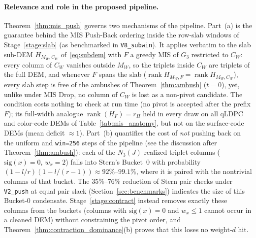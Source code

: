 \documentclass[12pt]{article}
\theoremstyle{definition}
\DeclareMathOperator{\rank}{rank}
\newcommand{\ttt}[1]{\texttt{#1}}
\begin{document}
\paragraph{Relevance and role in the proposed pipeline.}
Theorem~\ref{thm:mis_push} governs two mechanisms of the pipeline. Part~(a) is the guarantee behind the MIS
Push-Back ordering inside the row-slab windows of Stage~\ref{stage:slab} (as benchmarked in \ttt{V8\_subwin}). It
applies verbatim to the slab sub-DEM $H_{M_W, C_W}$ of~\eqref{eq:subdem} with $F$ a greedy MIS of $G_3$ restricted to
$C_W$: every column of $C_W$ vanishes outside $M_W$, so the triplets inside $C_W$ are triplets of the full DEM, and
whenever $F$ spans the slab ($\rank H_{M_W, F} = \rank H_{M_W, C_W}$), every slab step is free of the ambushes of
Theorem~\ref{thm:ambush} ($t = 0$), yet, unlike under MIS Drop, no column of $C_W$ is lost as a non-pivot candidate.
The condition costs nothing to check at run time (no pivot is accepted after the prefix $F$); its full-width analogue
$\rank(H_F) = r_H$ held in every draw on all qLDPC and color-code DEMs of Table~\ref{tab:mis_anatomy}, but not on the
surface-code DEMs (mean deficit $\approx 1$). Part~(b) quantifies the cost of \emph{not} pushing back on the uniform
and \ttt{win=256} steps of the pipeline (see the discussion after Theorem~\ref{thm:ambush}): each of the $N_3(J)$
realized triplet columns ($\mathrm{sig}(x) = 0$, $w_x = 2$) falls into Stern's Bucket~0 with probability $(1 -
l/r)(1 - l/(r - 1)) \approx 92\%$--$99.1\%$, where it is paired with the nontrivial columns of that bucket. The
$35\%$--$76\%$ reduction of Stern pair checks under \ttt{V2\_push} at equal pair slack (Section~\ref{sec:benchmarks})
indicates the size of this Bucket-0 condensate. Stage~\ref{stage:contract} instead removes exactly these columns
from the buckets (columns with $\mathrm{sig}(x) = 0$ and $w_x \le 1$ cannot occur in a cleaned DEM) without
constraining the pivot order, and Theorem~\ref{thm:contraction_dominance}(b) proves that this loses no weight-$d$
hit.
\end{document}
